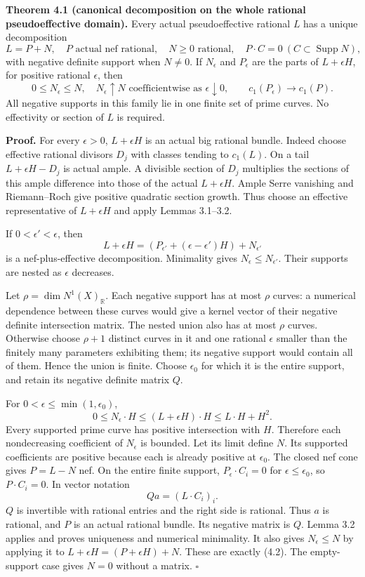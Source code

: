 \documentclass[
  10pt,
]{article}
\begin{document}
\textbf{Theorem 4.1 (canonical decomposition on the whole rational
pseudoeffective domain).} Every actual pseudoeffective rational \(L\)
has a unique decomposition \[
 L=P+N,
 \quad P\text{ actual nef rational},\quad N\geq0\text{ rational},
 \quad P\cdot C=0\ (C\subset\operatorname{Supp}N),
                                                               \tag{4.1}
\] with negative definite support when \(N\ne0\). If \(N_\epsilon\) and
\(P_\epsilon\) are the parts of \(L+\epsilon H\), for positive rational
\(\epsilon\), then \[
 0\leq N_\epsilon\leq N,\quad
 N_\epsilon\uparrow N\text{ coefficientwise as }\epsilon\downarrow0,
 \qquad c_1(P_\epsilon)\to c_1(P).                              \tag{4.2}
\] All negative supports in this family lie in one finite set of prime
curves. No effectivity or section of \(L\) is required.

\textbf{Proof.} For every \(\epsilon>0\), \(L+\epsilon H\) is an actual
big rational bundle. Indeed choose effective rational divisors \(D_j\)
with classes tending to \(c_1(L)\). On a tail \(L+\epsilon H-D_j\) is
actual ample. A divisible section of \(D_j\) multiplies the sections of
this ample difference into those of the actual \(L+\epsilon H\). Ample
Serre vanishing and Riemann--Roch give positive quadratic section
growth. Thus choose an effective representative of \(L+\epsilon H\) and
apply Lemmas 3.1--3.2.

If \(0<\epsilon'<\epsilon\), then \[
 L+\epsilon H=(P_{\epsilon'}+(\epsilon-\epsilon')H)+N_{\epsilon'}
\] is a nef-plus-effective decomposition. Minimality gives
\(N_\epsilon\leq N_{\epsilon'}\). Their supports are nested as
\(\epsilon\) decreases.

Let \(\rho=\dim N^1(X)_{\mathbb R}\). Each negative support has at most
\(\rho\) curves: a numerical dependence between these curves would give
a kernel vector of their negative definite intersection matrix. The
nested union also has at most \(\rho\) curves. Otherwise choose
\(\rho+1\) distinct curves in it and one rational \(\epsilon\) smaller
than the finitely many parameters exhibiting them; its negative support
would contain all of them. Hence the union is finite. Choose
\(\epsilon_0\) for which it is the entire support, and retain its
negative definite matrix \(Q\).

For \(0<\epsilon\leq\min(1,\epsilon_0)\), \[
 0\leq N_\epsilon\cdot H
       \leq (L+\epsilon H)\cdot H\leq L\cdot H+H^2.
\] Every supported prime curve has positive intersection with \(H\).
Therefore each nondecreasing coefficient of \(N_\epsilon\) is bounded.
Let its limit define \(N\). Its supported coefficients are positive
because each is already positive at \(\epsilon_0\). The closed nef cone
gives \(P=L-N\) nef. On the entire finite support,
\(P_\epsilon\cdot C_i=0\) for \(\epsilon\leq\epsilon_0\), so
\(P\cdot C_i=0\). In vector notation \[
 Q a=(L\cdot C_i)_i.
\] \(Q\) is invertible with rational entries and the right side is
rational. Thus \(a\) is rational, and \(P\) is an actual rational
bundle. Its negative matrix is \(Q\). Lemma 3.2 applies and proves
uniqueness and numerical minimality. It also gives \(N_\epsilon\leq N\)
by applying it to \(L+\epsilon H=(P+\epsilon H)+N\). These are exactly
(4.2). The empty-support case gives \(N=0\) without a matrix.
\(\square\)
\end{document}
